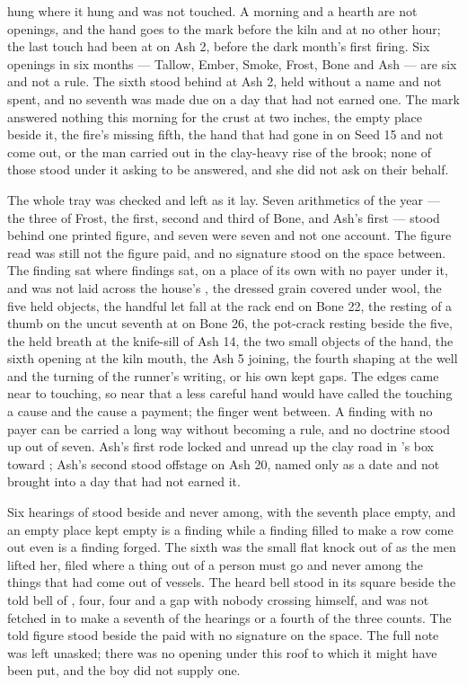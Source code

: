  hung where it hung and was not touched. A morning and a hearth are not openings, and the hand goes to the mark before the kiln and at no other hour; the last touch had been at  on Ash 2, before the dark month's first firing. Six openings in six months --- Tallow, Ember, Smoke, Frost, Bone and Ash --- are six and not a rule. The sixth stood behind at Ash 2, held without a name and not spent, and no seventh was made due on a day that had not earned one. The mark answered nothing this morning for the crust at two inches, the empty place beside it, the fire's missing fifth, the hand that had gone in on Seed 15 and not come out, or the man carried out in the clay-heavy rise of the brook; none of those stood under it asking to be answered, and she did not ask on their behalf.

\scenebreak

The whole tray was checked and left as it lay. Seven arithmetics of the year --- the three of Frost, the first, second and third of Bone, and Ash's first --- stood behind one printed figure, and seven were seven and not one account. The figure read was still not the figure paid, and no signature stood on the space between. The finding sat where findings sat, on a place of its own with no payer under it, and was not laid across the house's , the dressed grain covered under wool, the five held objects, the handful let fall at the rack end on Bone 22, the resting of a thumb on the uncut seventh at  on Bone 26, the pot-crack resting beside the five, the held breath at the knife-sill of Ash 14, the two small objects of the hand, the sixth opening at the kiln mouth, the Ash 5 joining, the fourth shaping at the well and the turning of the runner's writing, or his own kept gaps. The edges came near to touching, so near that a less careful hand would have called the touching a cause and the cause a payment; the finger went between. A finding with no payer can be carried a long way without becoming a rule, and no doctrine stood up out of seven. Ash's first rode locked and unread up the clay road in 's box toward ; Ash's second stood offstage on Ash 20, named only as a date and not brought into a day that had not earned it.

Six hearings of  stood beside and never among, with the seventh place empty, and an empty place kept empty is a finding while a finding filled to make a row come out even is a finding forged. The sixth was the small flat knock out of  as the men lifted her, filed where a thing out of a person must go and never among the things that had come out of vessels. The heard bell stood in its square beside the told bell of , four, four and a gap with nobody crossing himself, and was not fetched in to make a seventh of the hearings or a fourth of the three counts. The told figure stood beside the paid with no signature on the space. The full note was left unasked; there was no opening under this roof to which it might have been put, and the boy did not supply one.

